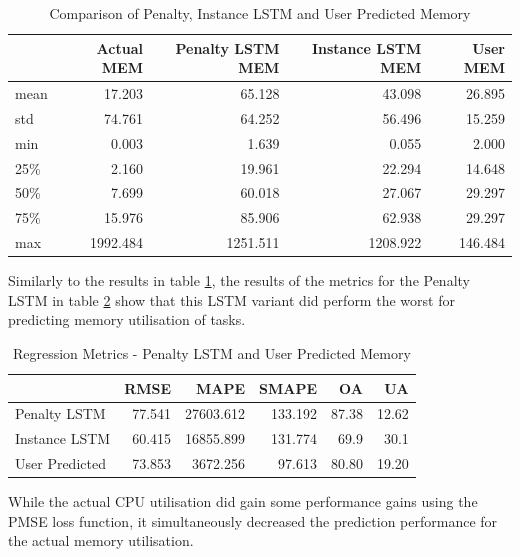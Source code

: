       \begin{table}
        \centering
        \caption{Comparison of Penalty, Instance LSTM and User Predicted Memory}
        \label{tab:comparison-pmse-lstm-user-predicted-memory}

        \begin{tabular}{|l|rrrr|}
          \toprule
          {} &  Actual MEM &  Penalty LSTM MEM &  Instance LSTM MEM &  User MEM \\
          \midrule
          mean &      17.203 &            65.128 &             43.098 &    26.895 \\
          std  &      74.761 &            64.252 &             56.496 &    15.259 \\
          min  &       0.003 &             1.639 &              0.055 &     2.000 \\
          25\%  &       2.160 &            19.961 &             22.294 &    14.648 \\
          50\%  &       7.699 &            60.018 &             27.067 &    29.297 \\
          75\%  &      15.976 &            85.906 &             62.938 &    29.297 \\
          max  &    1992.484 &          1251.511 &           1208.922 &   146.484 \\
          \bottomrule
          \end{tabular}
      \end{table}
      
      Similarly to the results in table \ref{tab:comparison-pmse-lstm-user-predicted-memory}, the results of the metrics for the Penalty LSTM in table \ref{tab:regression-metrics-pmse-lstm-user-predicted-memory} show that this LSTM variant did perform the worst for predicting memory utilisation of tasks.

      \begin{table}
        \centering
        \caption{Regression Metrics - Penalty LSTM and User Predicted Memory}
        \label{tab:regression-metrics-pmse-lstm-user-predicted-memory}

        \begin{tabular}{|l|rrrrr|}
          \toprule
          {} &    RMSE &       MAPE &    SMAPE &     OA &     UA \\
          \midrule
          Penalty LSTM   &  77.541 &  27603.612 &  133.192 &  87.38 &  12.62 \\
          Instance LSTM   &  60.415 &  16855.899 &  131.774 &  69.9 &  30.1 \\
          User Predicted &  73.853 &   3672.256 &   97.613 &  80.80 &  19.20 \\
          \bottomrule
        \end{tabular}
      \end{table}
      While the actual CPU utilisation did gain some performance gains using the PMSE loss function, it simultaneously decreased the prediction performance for the actual memory utilisation. 


